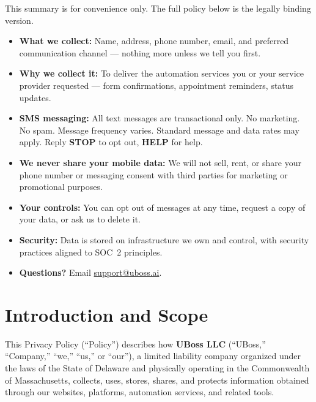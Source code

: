 \documentclass[11pt, letterpaper]{article}
\begin{document}
\begin{tcolorbox}[keysummary, title={Plain-Language Summary}]
This summary is for convenience only. The full policy below is the legally binding version.

\begin{itemize}[label=\textcolor{ubossaccent}{\textbullet}]
    \item \textbf{What we collect:} Name, address, phone number, email, and preferred
          communication channel --- nothing more unless we tell you first.
    \item \textbf{Why we collect it:} To deliver the automation services you or your
          service provider requested --- form confirmations, appointment reminders,
          status updates.
    \item \textbf{SMS messaging:} All text messages are transactional only. No marketing.
          No spam. Message frequency varies. Standard message and data rates may apply.
          Reply \textbf{STOP} to opt out, \textbf{HELP} for help.
    \item \textbf{We never share your mobile data:} We will not sell, rent, or share
          your phone number or messaging consent with third parties for marketing or
          promotional purposes.
    \item \textbf{Your controls:} You can opt out of messages at any time, request a
          copy of your data, or ask us to delete it.
    \item \textbf{Security:} Data is stored on infrastructure we own and control, with
          security practices aligned to SOC~2 principles.
    \item \textbf{Questions?} Email \href{mailto:support@uboss.ai}{support@uboss.ai}.
\end{itemize}
\end{tcolorbox}

\tableofcontents
\newpage

\section{Introduction and Scope}

This Privacy Policy (``Policy'') describes how \textbf{UBoss LLC} (``UBoss,'' ``Company,''
``we,'' ``us,'' or ``our''), a limited liability company organized under the laws of the
State of Delaware and physically operating in the Commonwealth of Massachusetts, collects,
uses, stores, shares, and protects information obtained through our websites, platforms,
automation services, and related tools.
\end{document}
